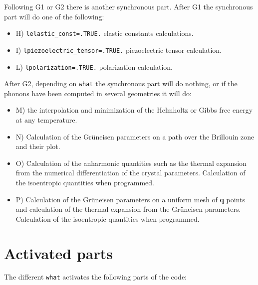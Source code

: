 \documentclass[12pt,a4paper]{article}
\begin{document}
Following G1 or G2 there is another synchronous part. 
After G1 the synchronous part will do one of the following:

\begin{itemize}

\item
H) \texttt{lelastic\_const=.TRUE.} elastic constants calculations.

\item
I) \texttt{lpiezoelectric\_tensor=.TRUE.} piezoelectric tensor calculation.

\item
L) \texttt{lpolarization=.TRUE.} polarization calculation.

\end{itemize}

After G2, depending on \texttt{what} the synchronous part will do nothing, 
or if the phonons have been computed in several geometries it will do:

\begin{itemize}

\item
M) the interpolation and minimization of the 
Helmholtz or Gibbs free energy at any temperature.

\item
N) Calculation of the Gr\"uneisen parameters on a path over the Brillouin
zone and their plot.

\item
O) Calculation of the anharmonic quantities such as the thermal expansion
from the numerical differentiation of the crystal parameters. Calculation
of the isoentropic quantities when programmed.

\item
P) Calculation of the Gr\"uneisen parameters on a uniform mesh of {\bf q} 
points and calculation of the thermal expansion from the Gr\"uneisen parameters.
Calculation of the isoentropic quantities when programmed.

\end{itemize}

\newpage
\section{\color{coral}Activated parts}

The different \texttt{what} activates the following parts of the code:
\end{document}
